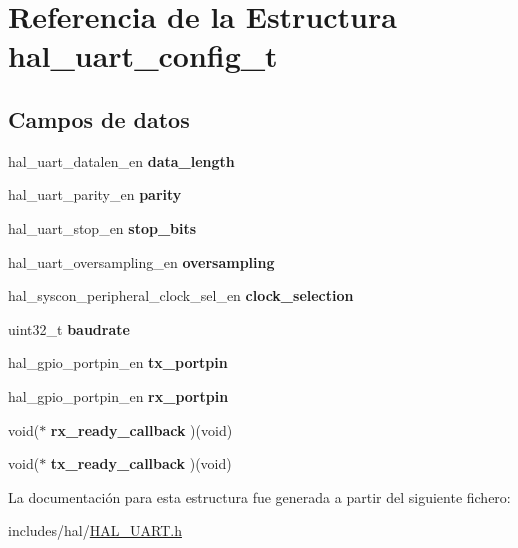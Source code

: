 \hypertarget{structhal__uart__config__t}{}\section{Referencia de la Estructura hal\+\_\+uart\+\_\+config\+\_\+t}
\label{structhal__uart__config__t}
\subsection*{Campos de datos}
\begin{DoxyCompactItemize}
\item 
\mbox{\label{structhal__uart__config__t_aaf92fb651f524eaea069b6d1a558c9de}} 
hal\+\_\+uart\+\_\+datalen\+\_\+en {\bfseries data\+\_\+length}
\item 
\mbox{\label{structhal__uart__config__t_a9bd5b1bb21fd5e35829f5f7b315da16c}} 
hal\+\_\+uart\+\_\+parity\+\_\+en {\bfseries parity}
\item 
\mbox{\label{structhal__uart__config__t_aa7cf41280cd25fd044890b68d16e3b82}} 
hal\+\_\+uart\+\_\+stop\+\_\+en {\bfseries stop\+\_\+bits}
\item 
\mbox{\label{structhal__uart__config__t_a5d1f4a22d0e12b71de9f5cc1e69a2331}} 
hal\+\_\+uart\+\_\+oversampling\+\_\+en {\bfseries oversampling}
\item 
\mbox{\label{structhal__uart__config__t_ae5d2d1fd4567721b32d4cf865ebef8cd}} 
hal\+\_\+syscon\+\_\+peripheral\+\_\+clock\+\_\+sel\+\_\+en {\bfseries clock\+\_\+selection}
\item 
\mbox{\label{structhal__uart__config__t_a3f9e84e994a84dbb22b493173e821412}} 
uint32\+\_\+t {\bfseries baudrate}
\item 
\mbox{\label{structhal__uart__config__t_ac4dc21cc540ea941924dcbcbcbdf2af9}} 
hal\+\_\+gpio\+\_\+portpin\+\_\+en {\bfseries tx\+\_\+portpin}
\item 
\mbox{\label{structhal__uart__config__t_a631f18a2373a6460ce2cdebcededf8f8}} 
hal\+\_\+gpio\+\_\+portpin\+\_\+en {\bfseries rx\+\_\+portpin}
\item 
\mbox{\label{structhal__uart__config__t_a0099c0472a9d392786a8866b3352f5ab}} 
void($\ast$ {\bfseries rx\+\_\+ready\+\_\+callback} )(void)
\item 
\mbox{\label{structhal__uart__config__t_ab750bde9677d9af0e3036393b3622889}} 
void($\ast$ {\bfseries tx\+\_\+ready\+\_\+callback} )(void)
\end{DoxyCompactItemize}


La documentación para esta estructura fue generada a partir del siguiente fichero\+:\begin{DoxyCompactItemize}
\item 
includes/hal/\hyperlink{HAL__UART_8h}{H\+A\+L\+\_\+\+U\+A\+R\+T.\+h}\end{DoxyCompactItemize}
